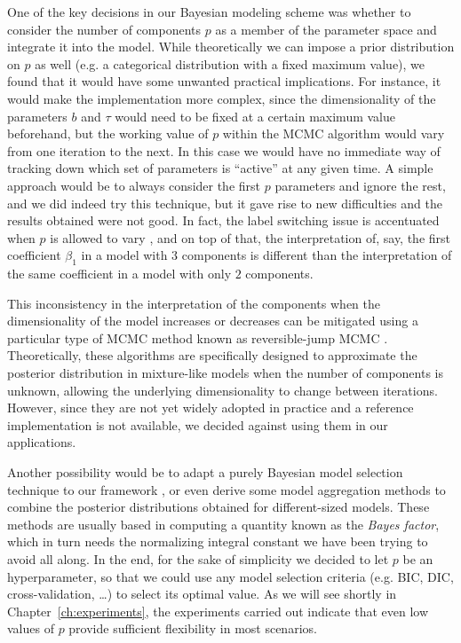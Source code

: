 One of the key decisions in our Bayesian modeling scheme was whether to consider the number of components \(p\) as a member of the parameter space and integrate it into the model. While theoretically we can impose a prior distribution on \(p\) as well (e.g. a categorical distribution with a fixed maximum value), we found that it would have some unwanted practical implications. For instance, it would make the implementation more complex, since the dimensionality of the parameters \(b\) and \(\tau\) would need to be fixed at a certain maximum value beforehand, but the working value of \(p\) within the MCMC algorithm would vary from one iteration to the next. In this case we would have no immediate way of tracking down which set of parameters is ``active'' at any given time. A simple approach would be to always consider the first \(p\) parameters and ignore the rest, and we did indeed try this technique, but it gave rise to new difficulties and the results obtained were not good. In fact, the label switching issue is accentuated when \(p\) is allowed to vary \citep[c.f.][Sec.~2.3]{grollemund2019bayesian}, and on top of that, the interpretation of, say, the first coefficient \(\beta_1\) in a model with \(3\) components is different than the interpretation of the same coefficient in a model with only \(2\) components.

This inconsistency in the interpretation of the components when the dimensionality of the model increases or decreases can be mitigated using a particular type of MCMC method known as reversible-jump MCMC \citep{green1995reversible}. Theoretically, these algorithms are specifically designed to approximate the posterior distribution in mixture-like models when the number of components is unknown, allowing the underlying dimensionality to change between iterations. However, since they are not yet widely adopted in practice and a reference implementation is not available, we decided against using them in our applications.

Another possibility would be to adapt a purely Bayesian model selection technique to our framework \citep[see][]{piironen2017comparison, gelman2013bayesian}, or even derive some model aggregation methods to combine the posterior distributions obtained for different-sized models. These methods are usually based in computing a quantity known as the \textit{Bayes factor}, which in turn needs the normalizing integral constant we have been trying to avoid all along. In the end, for the sake of simplicity we decided to let \(p\) be an hyperparameter, so that we could use any model selection criteria (e.g. BIC, DIC, cross-validation, \ldots) to select its optimal value. As we will see shortly in Chapter~\ref{ch:experiments}, the experiments carried out indicate that even low values of \(p\) provide sufficient flexibility in most scenarios.

